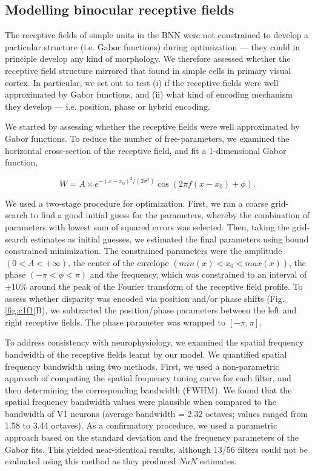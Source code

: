 \subsection*{Modelling binocular receptive fields}

The receptive fields of simple units in the BNN were not constrained to develop a particular structure (i.e. Gabor functions) during optimization --- they could in principle develop any kind of morphology. We therefore assessed whether the receptive field structure mirrored that found in simple cells in primary visual cortex. In particular, we set out to test (i) if the receptive fields were well approximated by Gabor functions, and (ii) what kind of encoding mechanism they develop --- i.e. position, phase or hybrid encoding. 

We started by assessing whether the receptive fields were well approximated by Gabor functions. To reduce the number of free-parameters, we examined the horizontal cross-section of the receptive field, and fit a 1-dimensional Gabor function,

\begin{equation}
  W = A \times e^{-(x-x_0)^2/(2 \sigma ^2)} \cos⁡ (2 \pi f(x-x_0)+\phi).
\end{equation}

We used a two-stage procedure for optimization. First, we ran a coarse grid-search to find a good initial guess for the parameters, whereby the combination of parameters with lowest sum of squared errors was selected. Then, taking the grid-search estimates as initial guesses, we estimated the final parameters using bound constrained minimization. The constrained parameters were the amplitude $(0<A<+\infty)$, the center of the envelope $(min(x)<x_0<max(x))$, the phase $(-\pi<\phi<\pi)$ and the frequency, which was constrained to an interval of $\pm 10\%$ around the peak of the Fourier transform of the receptive field profile. To assess whether disparity was encoded via position and/or phase shifts (Fig. \ref{fig:c1f1}B), we subtracted the position/phase parameters between the left and right receptive fields. The phase parameter was wrapped to $[-\pi,\pi]$. 

To address consistency with neurophysiology, we examined the spatial frequency bandwidth of the receptive fields learnt by our model. We quantified spatial frequency bandwidth using two methods. First, we used a non-parametric approach of computing the spatial frequency tuning curve for each filter, and then determining the corresponding bandwidth (FWHM). We found that the spatial frequency bandwidth values were plausible when compared to the bandwidth of V1 neurons \cite{De-Valois:1982fk} (average bandwidth = 2.32 octaves; values ranged from 1.58 to 3.44 octaves). As a confirmatory procedure, we used a parametric approach based on the standard deviation and the frequency parameters of the Gabor fits. This yielded near-identical results, although 13/56 filters could not be evaluated using this method as they produced $NaN$ estimates. 

